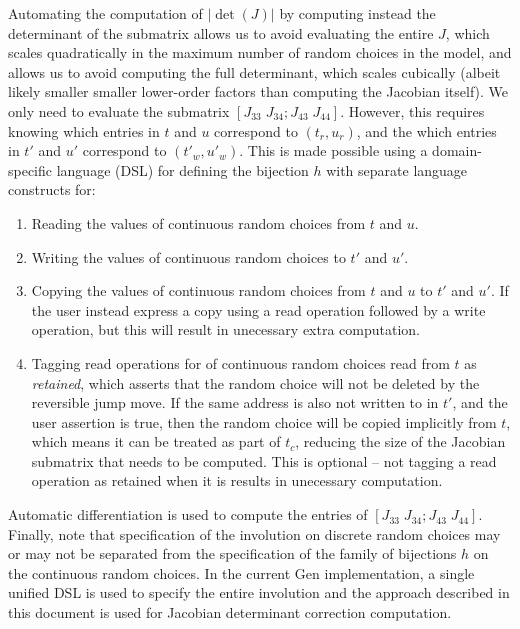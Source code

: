 \documentclass{article}
\begin{document}
Automating the computation of $|\det(J)|$ by computing instead the determinant of the submatrix allows us to avoid evaluating the entire $J$, which scales quadratically in the maximum number of random choices in the model, and allows us to avoid computing the full determinant, which scales cubically (albeit likely smaller smaller lower-order factors than computing the Jacobian itself).
We only need to evaluate the submatrix $[J_{33} \; J_{34}; J_{43} \; J_{44}]$.
However, this requires knowing which entries in $t$ and $u$ correspond to $(t_r, u_r)$, and the which entries in $t'$ and $u'$ correspond to $(t'_w, u'_w)$.
This is made possible using a domain-specific language (DSL) for defining the bijection $h$ with separate language constructs for:
\begin{enumerate}
\item Reading the values of continuous random choices from $t$ and $u$.
\item Writing the values of continuous random choices to $t'$ and $u'$.
\item Copying the values of continuous random choices from $t$ and $u$ to $t'$ and $u'$.
If the user instead express a copy using a read operation followed by a write operation, but this will result in unecessary extra computation.
\item Tagging read operations for of continuous random choices read from $t$ as \emph{retained}, which asserts that the random choice will not be deleted by the reversible jump move.
If the same address is also not written to in $t'$, and the user assertion is true, then the random choice will be copied implicitly from $t$, which means it can be treated as part of $t_c$, reducing the size of the Jacobian submatrix that needs to be computed.
This is optional -- not tagging a read operation as retained when it is results in unecessary computation.
\end{enumerate}
Automatic differentiation is used to compute the entries of $[J_{33} \; J_{34}; J_{43} \; J_{44}]$.
Finally, note that specification of the involution on discrete random choices may or may not be separated from the specification of the family of bijections $h$ on the continuous random choices.
In the current Gen implementation, a single unified DSL is used to specify the entire involution and the approach described in this document is used for Jacobian determinant correction computation.


 
\end{document}
